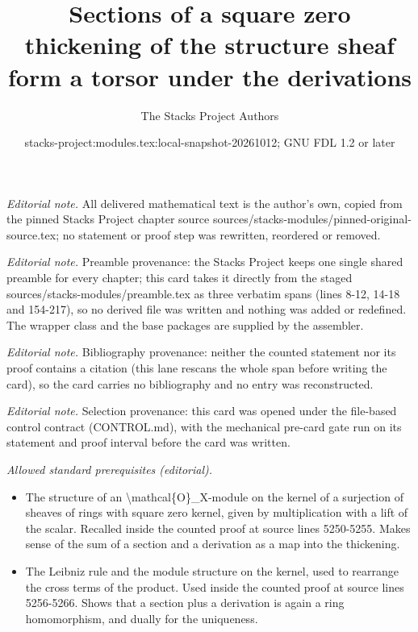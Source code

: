 \documentclass[10pt,a4paper]{amsart}
\title{Sections of a square zero thickening of the structure sheaf form a torsor under the derivations}
\author{The Stacks Project Authors}
\date{stacks-project:modules.tex:local-snapshot-20261012; GNU FDL 1.2 or later}
\theoremstyle{plain}
\theoremstyle{definition}
\theoremstyle{remark}
\numberwithin{equation}{subsection}
\begin{document}
\maketitle
\noindent\textit{Editorial note.} All delivered mathematical text is the author's own, copied from the pinned Stacks Project chapter source sources/stacks-modules/pinned-original-source.tex; no statement or proof step was rewritten, reordered or removed.\par\medskip
\noindent\textit{Editorial note.} Preamble provenance: the Stacks Project keeps one single shared preamble for every chapter; this card takes it directly from the staged sources/stacks-modules/preamble.tex as three verbatim spans (lines 8-12, 14-18 and 154-217), so no derived file was written and nothing was added or redefined. The wrapper class and the base packages are supplied by the assembler.\par\medskip
\noindent\textit{Editorial note.} Bibliography provenance: neither the counted statement nor its proof contains a citation (this lane rescans the whole span before writing the card), so the card carries no bibliography and no entry was reconstructed.\par\medskip
\noindent\textit{Editorial note.} Selection provenance: this card was opened under the file-based control contract (CONTROL.md), with the mechanical pre-card gate run on its statement and proof interval before the card was written.\par\medskip
\noindent\textit{Allowed standard prerequisites (editorial).}\begin{itemize}
\item The structure of an \textbackslash{}mathcal\{O\}\_X-module on the kernel of a surjection of sheaves of rings with square zero kernel, given by multiplication with a lift of the scalar. Recalled inside the counted proof at source lines 5250-5255. Makes sense of the sum of a section and a derivation as a map into the thickening.
\item The Leibniz rule and the module structure on the kernel, used to rearrange the cross terms of the product. Used inside the counted proof at source lines 5256-5266. Shows that a section plus a derivation is again a ring homomorphism, and dually for the uniqueness.
\end{itemize}\medskip
\end{document}

